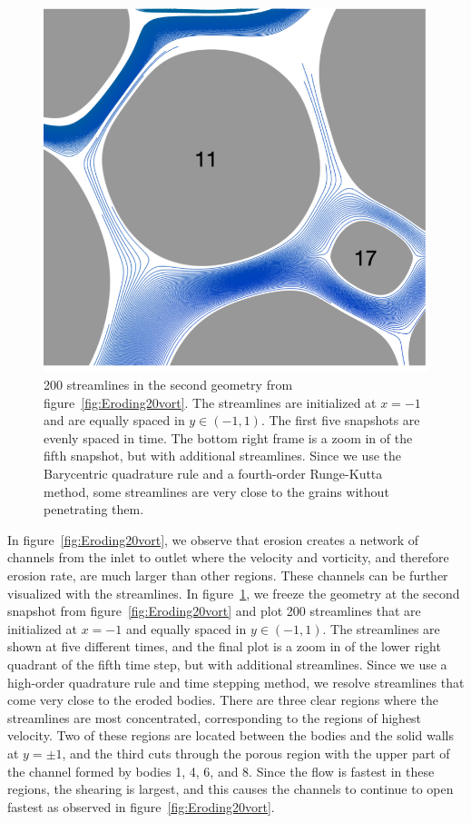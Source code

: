 \documentclass{jfm}
\begin{document}
\begin{figure}
\begin{center}
\includegraphics[width = 0.32 \textwidth]{./figs/tracer_20b270n_zoom}
\caption{\label{fig:Eroding20tracer} 200 streamlines in the second
geometry from figure~\ref{fig:Eroding20vort}. The streamlines are
initialized at $x=-1$ and are equally spaced in $y \in (-1,1)$. The
first five snapshots are evenly spaced in time.  The bottom right frame
is a zoom in of the fifth snapshot, but with additional streamlines.
Since we use the Barycentric quadrature rule and a fourth-order
Runge-Kutta method, some streamlines are very close to the grains
without penetrating them.}
\end{center}
\end{figure}


In figure~\ref{fig:Eroding20vort}, we observe that erosion creates a
network of channels from the inlet to outlet where the velocity and
vorticity, and therefore erosion rate, are much larger than other
regions.  These channels can be further visualized  with the
streamlines.  In figure~\ref{fig:Eroding20tracer}, we freeze the
geometry at the second snapshot from figure~\ref{fig:Eroding20vort} and
plot 200 streamlines that are initialized at $x=-1$ and equally spaced
in $y \in (-1,1)$.  The streamlines are shown at five different times,
and the final plot is a zoom in of the lower right quadrant of the fifth
time step, but with additional streamlines.  Since we use a high-order
quadrature rule and time stepping method, we resolve streamlines that
come very close to the eroded bodies.  There are three clear regions
where the streamlines are most concentrated, corresponding to the
regions of highest velocity.  Two of these regions are located between
the bodies and the solid walls at $y=\pm 1$, and the third cuts through
the porous region with the upper part of the channel formed by bodies 1,
4, 6, and 8.  Since the flow is fastest in these regions, the shearing
is largest, and this causes the channels to continue to open fastest as
observed in figure~\ref{fig:Eroding20vort}.
\end{document}
